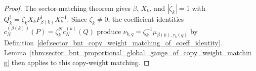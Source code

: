 \begin{proof}\leanok
    The sector-matching theorem gives $\beta$, $X_k$, and $|\zeta_k|=1$ with
    $Q_k^i=\zeta_kX_kP_{\beta(k)}^iX_k^{-1}$. Since $\zeta_k\ne0$, the
    coefficient identities
    $c_N^{(\beta(k))}(P)=\zeta_k^Nc_N^{(k)}(Q)$ produce
    $\nu_{k,q}=\zeta_k^{-1}\mu_{\beta(k),\tau_k(q)}$ by
    Definition~\ref{def:sector_bnt_copy_weight_matching_of_coeff_identity}.
    Lemma~\ref{thm:sector_bnt_proportional_global_gauge_of_copy_weight_matching}
    then applies to this copy-weight matching.
\end{proof}
